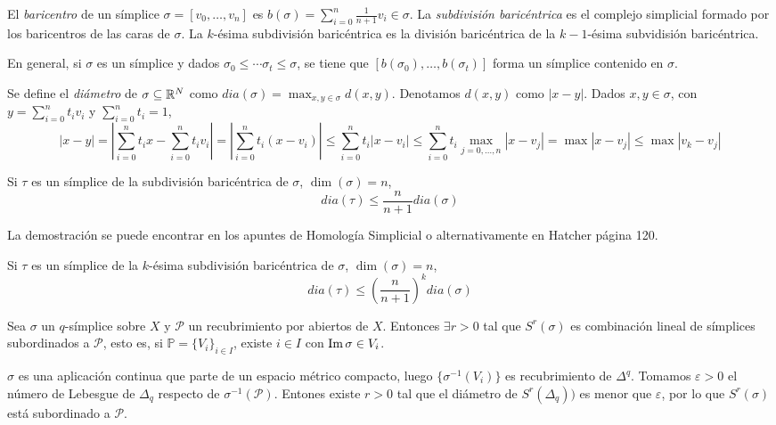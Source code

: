\documentclass[TA.tex]{subfiles}
\begin{document}
\begin{defi}
El \emph{baricentro} de un símplice $\sigma=[v_0,\dots, v_n]$ es $b(\sigma)=\sum_{i=0}^n\frac{1}{n+1}v_i\in \sigma$. La \emph{subdivisión baricéntrica} es el complejo simplicial formado por los baricentros de las caras de $\sigma$. La $k$-ésima subdivisión baricéntrica es la división baricéntrica de la $k-1$-ésima subvidisión baricéntrica.
\end{defi}

En general, si $\sigma$ es un símplice y dados $\sigma_0\leq\cdots\sigma_t\leq\sigma$, se tiene que $[b(\sigma_0),\dots, b(\sigma_t)]$ forma un símplice contenido en $\sigma$. 

Se define el \emph{diámetro} de $\sigma\subseteq \mathbb{R}^N$ como $dia(\sigma)=\max_{x,y\in\sigma} d(x,y)$. Denotamos $d(x,y)$ como $|x-y|$. Dados $x,y\in\sigma$, con $y=\sum_{i=0}^n t_iv_i$ y $\sum_{i=0}^nt_i=1$, 
\[
|x-y|=\left|\sum_{i=0}^nt_ix-\sum_{i=0}^nt_iv_i\right|=\left|\sum_{i=0}^nt_i(x-v_i)\right|\leq \sum_{i=0}^n t_i|x-v_i|\leq \sum_{i=0}^nt_i\max_{j=0,\dots, n}|x-v_j|=\max|x-v_j|\leq \max|v_k-v_j|
\]

\begin{lemma}
 Si $\tau$ es un símplice de la subdivisión baricéntrica de $\sigma$, $\dim(\sigma)=n$, 
\[
dia(\tau)\leq\frac{n}{n+1}dia(\sigma)
\]
\end{lemma}

La demostración se puede encontrar en los apuntes de Homología Simplicial o alternativamente en Hatcher página 120. 

\begin{coro}
Si $\tau$ es un símplice de la $k$-ésima subdivisión baricéntrica de $\sigma$, $\dim(\sigma)=n$, 
\[
dia(\tau)\leq \left(\frac{n}{n+1}\right)^k dia(\sigma)
\]
\end{coro}

\begin{coro}\label{r}
Sea $\sigma$ un $q$-símplice sobre $X$ y $\mathcal{P}$ un recubrimiento por abiertos de $X$. Entonces $\exists r>0$ tal que $S^r(\sigma)$ es combinación lineal de símplices subordinados a $\mathcal{P}$, esto es, si $\mathbb{P}=\{V_i\}_{i\in I}$, existe $i\in I$ con $\operatorname{Im}\sigma\in V_i$. 
\end{coro}
\begin{dem}
$\sigma$ es una aplicación continua que parte de un espacio métrico compacto, luego $\{\sigma^{-1}(V_i)\}$ es recubrimiento de $\Delta^q$. Tomamos $\varepsilon>0$ el número de Lebesgue de $\Delta_q$ respecto de $\sigma^{-1}(\mathcal{P})$. Entones existe $r>0$ tal que el diámetro de $S^r(\Delta_q))$ es menor que $\varepsilon$, por lo que $S^r(\sigma)$ está subordinado a $\mathcal{P}$. 
\end{dem}
\end{document}
